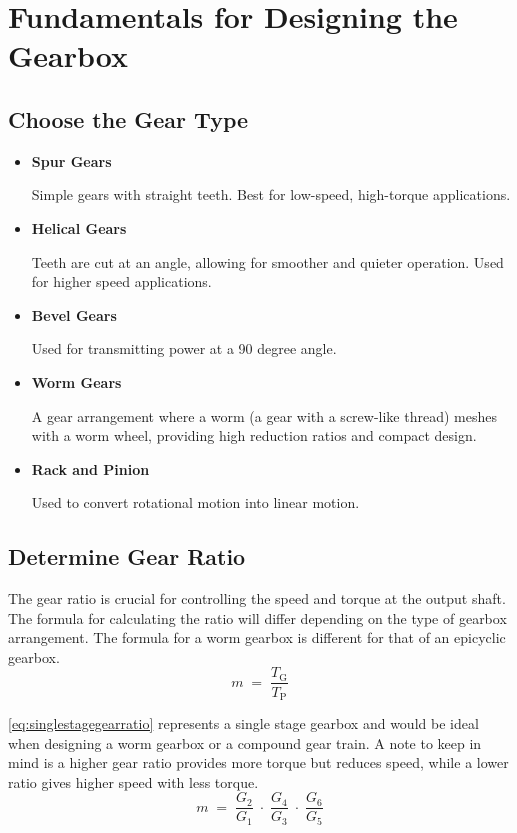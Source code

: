 \section{Fundamentals for Designing the Gearbox}
    \subsection{Choose the Gear Type}
        \begin{itemize}
			\item \textbf{Spur Gears}\par
            Simple gears with straight teeth. Best for low-speed, high-torque applications.
			\item \textbf{Helical Gears}\par
            Teeth are cut at an angle, allowing for smoother and quieter operation. Used for higher speed applications.
			\item \textbf{Bevel Gears}\par
            Used for transmitting power at a 90 degree angle.
            \item \textbf{Worm Gears}\par
            A gear arrangement where a worm (a gear with a screw-like thread) meshes with a worm wheel, providing high reduction ratios and compact design.
            \item \textbf{Rack and Pinion}\par
            Used to convert rotational motion into linear motion.
		\end{itemize}

    \subsection{Determine Gear Ratio}
        The gear ratio is crucial for controlling the speed and torque at the output shaft. The formula for calculating the 
        ratio will differ depending on the type of gearbox arrangement. The formula for a worm gearbox is different for that 
        of an epicyclic gearbox.
            \begin{equation}
                \label{eq:singlestagegearratio}
                m \;=\; \frac{T_{\text{G}}}{T_{\text{P}}}
            \end{equation}

        \autoref{eq:singlestagegearratio} represents a single stage gearbox and would be ideal when designing a worm gearbox or a 
        compound gear train. A note to keep in mind is a higher gear ratio provides more torque but reduces speed, while 
        a lower ratio gives higher speed with less torque. 
            \begin{equation}
                \label{eq:triplestagegearratio}
                m \;=\;
                \frac{G_{\text{2}}}{G_{\text{1}}}
                \;\cdot\;
                \frac{G_{\text{4}}}{G_{\text{3}}}
                \;\cdot\;
                \frac{G_{\text{6}}}{G_{\text{5}}}
            \end{equation}
        
